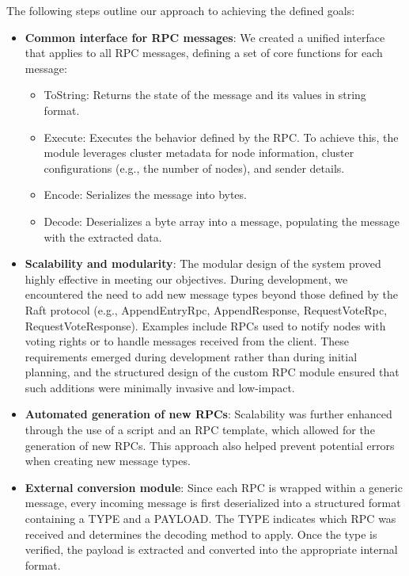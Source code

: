 The following steps outline our approach to achieving the defined goals:
\begin{itemize}
	\item \textbf{Common interface for RPC messages}:
    We created a unified interface that applies to all RPC messages, defining a set of 
    core functions for each message:
    	\begin{itemize}
        	\item ToString: Returns the state of the message and its values in string format.
        	\item Execute: Executes the behavior defined by the RPC. To achieve this, the 
            module leverages cluster metadata for node information, cluster configurations 
            (e.g., the number of nodes), and sender details.
        	\item Encode: Serializes the message into bytes.
        	\item Decode: Deserializes a byte array into a message, populating the message with the extracted data.
	    \end{itemize}

    	\item \textbf{Scalability and modularity}:
    The modular design of the system proved highly effective in meeting our objectives. 
    During development, we encountered the need to add new message types beyond those 
    defined by the Raft protocol (e.g., AppendEntryRpc, AppendResponse, RequestVoteRpc, 
    RequestVoteResponse). Examples include RPCs used to notify nodes with voting rights 
    or to handle messages received from the client.
    These requirements emerged during development rather than during initial planning, 
    and the structured design of the custom RPC module ensured that such additions 
    were minimally invasive and low-impact.

    	\item \textbf{Automated generation of new RPCs}:
    Scalability was further enhanced through the use of a script and an RPC template, 
    which allowed for the generation of new RPCs. This approach also helped prevent 
    potential errors when creating new message types.

    	\item \textbf{External conversion module}:
    Since each RPC is wrapped within a generic message, 
        every incoming message is first deserialized into a structured format 
    containing a TYPE and a PAYLOAD.
    The TYPE indicates which RPC was received and determines the decoding method to apply.
    Once the type is verified, the payload is extracted and converted into the appropriate internal format.


\end{itemize}
